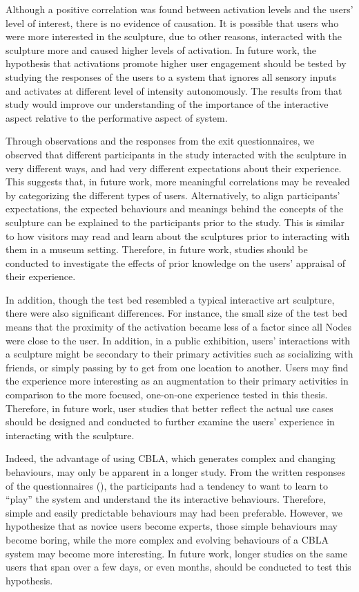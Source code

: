 Although a positive correlation was found between activation levels and the users' level of interest, there is no evidence of causation. It is possible that users who were more interested in the sculpture, due to other reasons, interacted with the sculpture more and caused higher levels of activation. In future work, the hypothesis that activations promote higher user engagement should be tested by studying the responses of the users to a system that ignores all sensory inputs and activates at different level of intensity autonomously. The results from that study would improve our understanding of the importance of the interactive aspect relative to the performative aspect of system.

Through observations and the responses from the exit questionnaires, we observed that different participants in the study interacted with the sculpture in very different ways, and had very different expectations about their experience. This suggests that, in future work, more meaningful correlations may be revealed by categorizing the different types of users. Alternatively, to align participants' expectations, the expected behaviours and meanings behind the concepts of the sculpture can be explained to the participants prior to the study. This is similar to how visitors may read and learn about the sculptures prior to interacting with them in a museum setting. Therefore, in future work, studies should be conducted to investigate the effects of prior knowledge on the users' appraisal of their experience. 

In addition, though the test bed resembled a typical interactive art sculpture, there were also significant differences. For instance, the small size of the test bed means that the proximity of the activation became less of a factor since all Nodes were close to the user. In addition, in a public exhibition, users' interactions with a sculpture might be secondary to their primary activities such as socializing with friends, or simply passing by to get from one location to another. Users may find the experience more interesting as an augmentation to their primary activities in comparison to the more focused, one-on-one experience tested in this thesis. Therefore, in future work, user studies that better reflect the actual use cases should be designed and conducted to further examine the users' experience in interacting with the sculpture. 

Indeed, the advantage of using CBLA, which generates complex and changing behaviours, may only be apparent in a longer study. From the written responses of the questionnaires (), the participants had a tendency to want to learn to ``play'' the system and understand the its interactive behaviours. Therefore, simple and easily predictable behaviours may had been preferable. However, we hypothesize that as novice users become experts, those simple behaviours may become boring, while the more complex and evolving behaviours of a CBLA system may become more interesting. In future work, longer studies on the same users that span over a few days, or even months, should be conducted to test this hypothesis.

